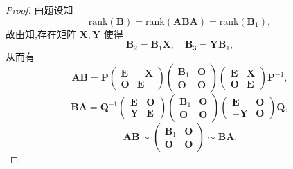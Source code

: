\documentclass[../../main.tex]{subfiles}%
\begin{document}
\begin{proof}
由题设知
\[
\mathrm{rank}(\boldsymbol{B}) = \mathrm{rank}(\boldsymbol{ABA}) = \mathrm{rank}(\boldsymbol{B}_1),
\]
故由知,存在矩阵 \( \boldsymbol{X}, \boldsymbol{Y} \) 使得
\[
\boldsymbol{B}_2 = \boldsymbol{B}_1\boldsymbol{X}, \quad \boldsymbol{B}_3 = \boldsymbol{Y}\boldsymbol{B}_1,
\]
从而有
\[
\boldsymbol{AB} = \boldsymbol{P} \begin{pmatrix} \boldsymbol{E} & -\boldsymbol{X} \\ \boldsymbol{O} & \boldsymbol{E} \end{pmatrix} \begin{pmatrix} \boldsymbol{B}_1 & \boldsymbol{O} \\ \boldsymbol{O} & \boldsymbol{O} \end{pmatrix} \begin{pmatrix} \boldsymbol{E} & \boldsymbol{X} \\ \boldsymbol{O} & \boldsymbol{E} \end{pmatrix} \boldsymbol{P}^{-1},
\]
\[
\boldsymbol{BA} = \boldsymbol{Q}^{-1} \begin{pmatrix} \boldsymbol{E} & \boldsymbol{O} \\ \boldsymbol{Y} & \boldsymbol{E} \end{pmatrix} \begin{pmatrix} \boldsymbol{B}_1 & \boldsymbol{O} \\ \boldsymbol{O} & \boldsymbol{O} \end{pmatrix} \begin{pmatrix} \boldsymbol{E} & \boldsymbol{O} \\ -\boldsymbol{Y} & \boldsymbol{O} \end{pmatrix} \boldsymbol{Q},
\]
\[
\boldsymbol{AB} \sim \begin{pmatrix} \boldsymbol{B}_1 & \boldsymbol{O} \\ \boldsymbol{O} & \boldsymbol{O} \end{pmatrix} \sim \boldsymbol{BA}.
\]
\end{proof}
\end{document}
